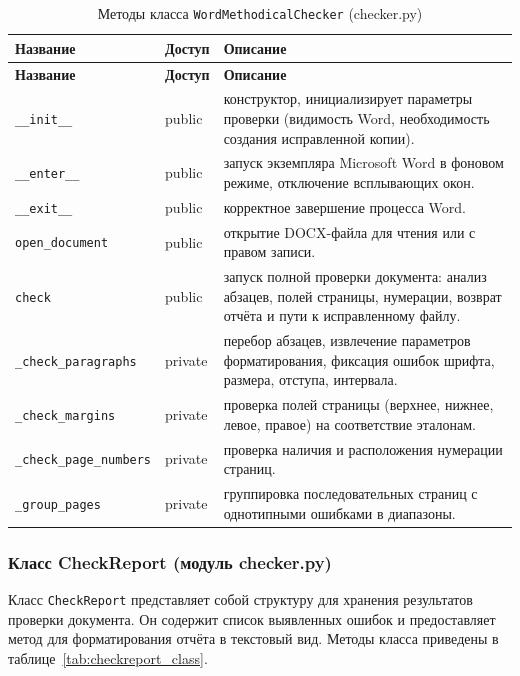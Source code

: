 \begin{xltabular}{\textwidth}{|p{7cm}|p{1.8cm}|X|}
	\caption{Методы класса \texttt{WordMethodicalChecker} (checker.py)\label{tab:checker_class}}\\
	\hline
	\textbf{Название} & \textbf{Доступ} & \textbf{Описание} \\
	\hline
	\endfirsthead
	
	\hline
	\textbf{Название} & \textbf{Доступ} & \textbf{Описание} \\
	\hline
	\endhead
	
	\hline
	\endfoot
	
	\texttt{\_\_init\_\_} & public & конструктор, инициализирует параметры проверки (видимость Word, необходимость создания исправленной копии). \\ \hline
	\texttt{\_\_enter\_\_} & public & запуск экземпляра Microsoft Word в фоновом режиме, отключение всплывающих окон. \\ \hline
	\texttt{\_\_exit\_\_} & public & корректное завершение процесса Word. \\ \hline
	\texttt{open\_document} & public & открытие DOCX-файла для чтения или с правом записи. \\ \hline
	\texttt{check} & public & запуск полной проверки документа: анализ абзацев, полей страницы, нумерации, возврат отчёта и пути к исправленному файлу. \\ \hline
	\texttt{\_check\_paragraphs} & private & перебор абзацев, извлечение параметров форматирования, фиксация ошибок шрифта, размера, отступа, интервала. \\ \hline
	\texttt{\_check\_margins} & private & проверка полей страницы (верхнее, нижнее, левое, правое) на соответствие эталонам. \\ \hline
	\texttt{\_check\_page\_numbers} & private & проверка наличия и расположения нумерации страниц. \\ \hline
	\texttt{\_group\_pages} & private & группировка последовательных страниц с однотипными ошибками в диапазоны. \\ \hline
\end{xltabular}

\subsubsection{Класс CheckReport (модуль checker.py)}

Класс \texttt{CheckReport} представляет собой структуру для хранения результатов проверки документа. Он содержит список выявленных ошибок и предоставляет метод для форматирования отчёта в текстовый вид. Методы класса приведены в таблице~\ref{tab:checkreport_class}.

